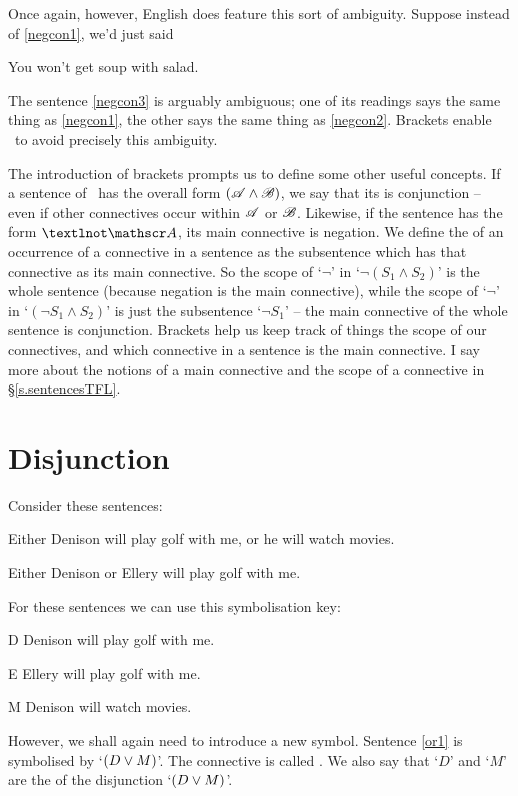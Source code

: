 Once again, however, English does feature this sort of ambiguity. Suppose instead of \ref{negcon1}, we'd just said \begin{earg}
	\item[\ex{negcon3}] You won't get soup with salad.
\end{earg}
The sentence \ref{negcon3} is arguably ambiguous; one of its readings says the same thing as \ref{negcon1}, the other says the same thing as \ref{negcon2}. Brackets enable \TFL\ to avoid precisely this ambiguity.

The introduction of brackets prompts us to define some other useful concepts. If a sentence of \TFL\ has the overall form $(\mathscr{A} \wedge \mathscr{B})$, we say that its  is conjunction – even if other connectives occur within $\mathscr{A}$ or $\mathscr{B}$. Likewise, if the sentence has the form $¬\meta{A}$, its main connective is negation. We define the  of an occurrence of a connective in a sentence as the subsentence which has that connective as its main connective. So the scope of `$¬$' in `$¬(S_{1} \wedge S_{2})$' is the whole sentence (because negation is the main connective), while the scope of `$¬$' in `$(¬S_{1}\wedge S_{2})$' is just the subsentence `$¬S_{1}$' – the main connective of the whole sentence is conjunction. Brackets help us keep track of things the scope of our connectives, and which connective in a sentence is the main connective. I say more about the notions of a main connective and the scope of a connective in §\ref{s.sentencesTFL}.

\section{Disjunction}
Consider these sentences:
	\begin{earg}
		\item[\ex{or1}]Either Denison will play golf with me, or he will watch movies.
		\item[\ex{or2}]Either Denison or Ellery will play golf with me. 
	\end{earg}
For these sentences we can use this symbolisation key:
	\begin{ekey}
		\item[D] Denison will play golf with me.
		\item[E] Ellery will play golf with me.
		\item[M] Denison will watch movies.
	\end{ekey}
However, we shall again need to introduce a new symbol. Sentence \ref{or1} is symbolised by `$(D \vee M)$'. The connective is called . We also say that `$D$' and `$M$' are the  of the disjunction `$(D \vee M)$'.

